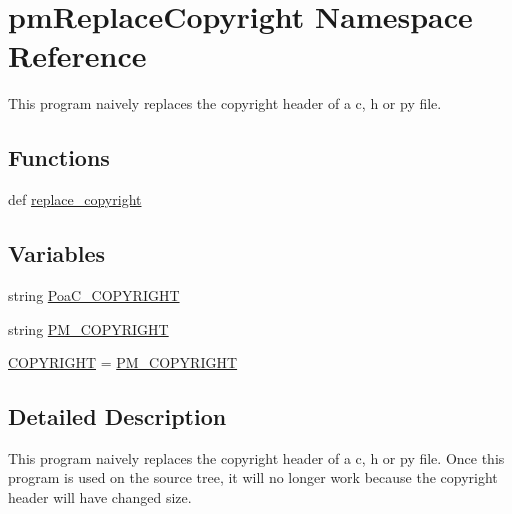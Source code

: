 \hypertarget{namespacepm_replace_copyright}{\section{pm\-Replace\-Copyright Namespace Reference}
\label{namespacepm_replace_copyright}
}


This program naively replaces the copyright header of a c, h or py file.  


\subsection*{Functions}
\begin{DoxyCompactItemize}
\item 
def \hyperlink{namespacepm_replace_copyright_a8aec7017d88876149477262e708f5110}{replace\-\_\-copyright}
\end{DoxyCompactItemize}
\subsection*{Variables}
\begin{DoxyCompactItemize}
\item 
string \hyperlink{namespacepm_replace_copyright_a7a6335a19d4303bcd80f39866241784d}{Poa\-C\-\_\-\-C\-O\-P\-Y\-R\-I\-G\-H\-T}
\item 
string \hyperlink{namespacepm_replace_copyright_a5690305e1b65a3a05f61ccb58841dbf1}{P\-M\-\_\-\-C\-O\-P\-Y\-R\-I\-G\-H\-T}
\item 
\hyperlink{namespacepm_replace_copyright_a8aee0cc00feffcb0afcb4cea9ab0aa1e}{C\-O\-P\-Y\-R\-I\-G\-H\-T} = \hyperlink{namespacepm_replace_copyright_a5690305e1b65a3a05f61ccb58841dbf1}{P\-M\-\_\-\-C\-O\-P\-Y\-R\-I\-G\-H\-T}
\end{DoxyCompactItemize}


\subsection{Detailed Description}
This program naively replaces the copyright header of a c, h or py file. Once this program is used on the source tree, it will no longer work because the copyright header will have changed size. 

